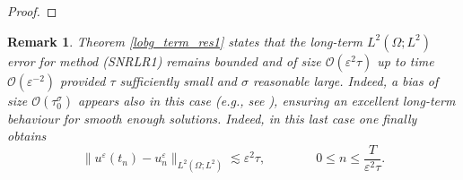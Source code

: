 \documentclass[a4paper]{amsart}
\newtheorem{remark}{Remark}[section]
\begin{document}
\begin{proof}

\end{proof}

\begin{remark}
    Theorem \ref{lobg_term_res1} states that the long-term $L^2(\Omega; L^2)$ error for method (SNRLR1) remains bounded and of size $\mathcal{O}(\varepsilon^2 \tau)$ up to time $\mathcal{O}(\varepsilon^{-2})$ provided $\tau$ sufficiently small and $\sigma$ reasonable large. Indeed, a bias of size $\mathcal{O}(\tau_0^\sigma)$ appears also in this case (e.g., see \cite{fe_ka}), ensuring an excellent long-term behaviour for smooth enough solutions. Indeed, in this last case one finally obtains
    $$
    \|u^\varepsilon(t_n)-u^\varepsilon_n\|_{L^2(\Omega; L^2)}\lesssim\varepsilon^2 \tau, \qquad \qquad 0\le n \le \frac{T}{\varepsilon^2 \tau}.
    $$
\end{remark}
\end{document}
